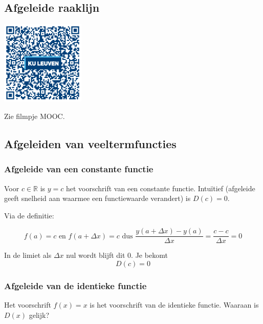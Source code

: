 \subsection{Afgeleide raaklijn}

\begin{minipage}{.25\linewidth}
	\raggedright
	\includegraphics[width=4cm]{6_afgeleiden_integralen/inputs/QR_Code_AFGRAAKLIJN_module6new}
\end{minipage}
\begin{minipage}{.7\linewidth}
	Zie filmpje MOOC.
\end{minipage}

\subsection{Afgeleiden van veeltermfuncties}

\subsubsection{Afgeleide van een constante functie}

Voor $c\in \mathbb{R}$ is $y=c$ het voorschrift van een constante functie.
Intu\"itief (afgeleide geeft snelheid aan waarmee een functiewaarde verandert) is $D(c)=0$.\vspace{3 mm}

Via de definitie:

\begin{equation*}
f(a)=c \text{ en } f(a+\Delta x)= c \text{ dus } \frac{y(a+ \Delta x)-y(a)}{\Delta x}=\frac {c-c}{\Delta x}=0
\end{equation*}

In de limiet als $\Delta x$ nul wordt blijft dit 0.
Je bekomt 
\[D(c)=0\]

\subsubsection{Afgeleide van de identieke functie}

Het voorschrift $f(x)=x$ is het voorschrift van de identieke functie.
Waaraan is $D(x)$ gelijk?\vspace{3mm}

